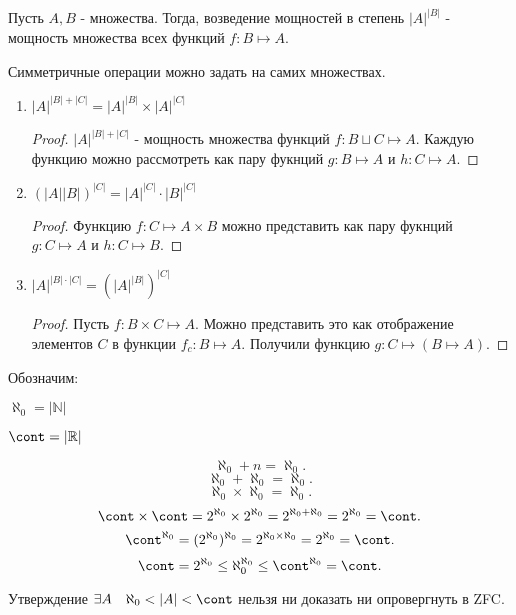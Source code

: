 \begin{definition} \thmslashn 

     Пусть $A, B$ - множества. Тогда, возведение мощностей в степень $|A|^{ |B| }$ - мощность множества всех функций $f : B \mapsto A$.
\end{definition}
\begin{remark} \thmslashn

    Симметричные операции можно задать на самих множествах.
\end{remark}
\begin{properties} \thmslashn

    \begin{enumerate}
        \item $|A|^{ |B|+|C| } = |A|^{ |B| } \times |A|^{ |C| }$ 
            \begin{proof} \thmslashn
            
                $|A|^{ |B| + |C| }$ - мощность множества функций $f : B \sqcup C \mapsto A$. Каждую функцию можно рассмотреть как пару фукнций $g : B \mapsto A$ и $h : C \mapsto A$.
            \end{proof}
        \item $(|A| |B|)^{ |C| } = |A|^{ |C| } \cdot |B|^{ |C| }$ 
            \begin{proof} \thmslashn
            
                Функцию $f : C \mapsto A \times B$ можно представить как пару фукнций $g : C \mapsto A$ и $h : C \mapsto B$.
            \end{proof}
        \item $|A|^{ |B| \cdot |C|} = \left(|A|^{ |B| }\right)^{ |C| }$ 
            \begin{proof} \thmslashn
            
                Пусть $f : B \times C \mapsto A$. Можно представить это как отображение элементов $C$ в функции $f_{c} : B \mapsto A$. Получили функцию $g : C \mapsto (B \mapsto A)$.
            \end{proof}
    \end{enumerate}
\end{properties}
\begin{definition} \thmslashn 

    Обозначим:
    
    $\aleph_{0} = |\mathbb{N}|$

    $\cont = |\mathbb{R}|$ 

\end{definition}
\begin{properties} \thmslashn

    \[ \aleph_{0} + n = \aleph_{0} .\]
    \[ \aleph_{0} + \aleph_{0} = \aleph_{0} .\]
    \[ \aleph_{0} \times \aleph_{0} = \aleph_{0} .\]
    \[ \cont \times  \cont = 2^{\aleph_{0}} \times 2^{\aleph_{0}} = 2^{\aleph_{0} + \aleph_{0}} = 2^{\aleph_{0}} = \cont .\]
    \[ \cont^{\aleph_{0}} = (2^{\aleph_{0}})^{\aleph_{0}} = 2^{\aleph_{0} \times \aleph_{0}} = 2^{\aleph_{0}} = \cont .\]
    \[ \cont = 2^{\aleph_{0}} \le \aleph_{0}^{\aleph_{0}} \le \cont^{\aleph_{0}} = \cont .\] 
\end{properties}
\begin{statement} \thmslashn

    Утверждение $\exists{A}\quad \aleph_{0} < |A| < \cont$ нельзя ни доказать ни опровергнуть в ZFC.
\end{statement}
